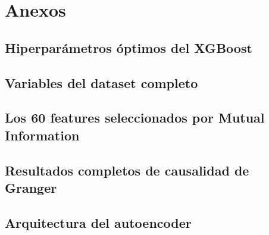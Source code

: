 \chapter{Anexos}

\section{Hiperparámetros óptimos del XGBoost}

\section{Variables del dataset completo}

\section{Los 60 features seleccionados por Mutual Information}

\section{Resultados completos de causalidad de Granger}

\section{Arquitectura del autoencoder}
